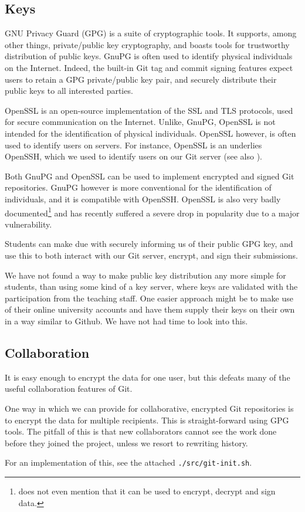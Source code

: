 \subsection{Keys}

GNU Privacy Guard (GPG) is a suite of cryptographic tools. It supports, among
other things, private/public key cryptography, and boasts tools for trustworthy
distribution of public keys. GnuPG is often used to identify physical
individuals on the Internet. Indeed, the built-in Git tag and commit signing
features expect users to retain a GPG private/public key pair, and securely
distribute their public keys to all interested parties.

OpenSSL is an open-source implementation of the SSL and TLS protocols, used for
secure communication on the Internet. Unlike, GnuPG, OpenSSL is not intended
for the identification of physical individuals. OpenSSL however, is often used
to identify users on servers. For instance, OpenSSL is an underlies OpenSSH,
which we used to identify users on our Git server (see also
).

Both GnuPG and OpenSSL can be used to implement encrypted and signed Git
repositories. GnuPG however is more conventional for the identification of
individuals, and it is compatible with OpenSSH\cite{man-1-gpg-agent}. OpenSSL
is also very badly documented\footnote{\cite{man-1-openssl} does not even
mention that it can be used to encrypt, decrypt and sign data.} and has
recently suffered a severe drop in popularity due to a major
vulnerability\cite{cvedetails-com-2014c}.

Students can make due with securely informing us of their public GPG key, and
use this to both interact with our Git server, encrypt, and sign their
submissions.

We have not found a way to make public key distribution any more simple for
students, than using some kind of a key server, where keys are validated with
the participation from the teaching staff. One easier approach might be to make
use of their online university accounts and have them supply their keys on
their own in a way similar to Github. We have not had time to look into this.

\subsection{Collaboration}

It is easy enough to encrypt the data for one user, but this defeats many of
the useful collaboration features of Git.

One way in which we can provide for collaborative, encrypted Git repositories
is to encrypt the data for multiple recipients. This is straight-forward using
GPG tools\cite{man-1-gpg2}. The pitfall of this is that new collaborators
cannot see the work done before they joined the project, unless we resort to
rewriting history.

For an implementation of this, see the attached \texttt{./src/git-init.sh}.
